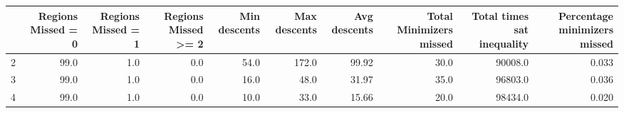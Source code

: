 \begin{tabular}{lrrrrrrrrr}
\toprule
{} &  Regions Missed = 0 &  Regions Missed = 1 &  Regions Missed >= 2 &  Min descents &  Max descents &  Avg descents &  Total Minimizers missed &  Total times sat inequality &  Percentage minimizers missed \\
\midrule
2 &                99.0 &                 1.0 &                  0.0 &          54.0 &         172.0 &         99.92 &                     30.0 &                     90008.0 &                         0.033 \\
3 &                99.0 &                 1.0 &                  0.0 &          16.0 &          48.0 &         31.97 &                     35.0 &                     96803.0 &                         0.036 \\
4 &                99.0 &                 1.0 &                  0.0 &          10.0 &          33.0 &         15.66 &                     20.0 &                     98434.0 &                         0.020 \\
\bottomrule
\end{tabular}

